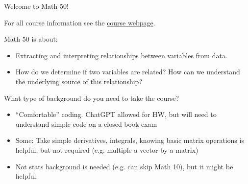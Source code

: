 \documentclass[serif,mathserif]{beamer}
\begin{document}

\begin{frame}
\centering
{\Large {Welcome to Math 50!}}
\centering

\vspace{1cm}
For all course information see the \href{https://elevien.github.io/Math50_2024/}{course webpage}.

 



\end{frame}

\begin{frame}


Math 50 is about:
\begin{itemize}
\item  Extracting and interpreting relationships between variables from data. \pause
\item How do we determine if two variables are related? How can we understand the underlying source of this relationship? 
\end{itemize}
\end{frame}


\begin{frame}
What type of background do you need to take the course? \pause 
\begin{itemize}
\item ``Comfortable'' coding. ChatGPT allowed for HW, but will need to understand simple code on a closed book exam\pause 
\item Some: Take simple derivatives, integrals, knowing basic matrix operations is helpful, but not required (e.g. multiple a vector by a matrix)\pause 
\item Not stats background is needed (e.g. can skip Math 10), but it might be helpful. 
\end{itemize}
\end{frame}

%
%
%
\end{document}
